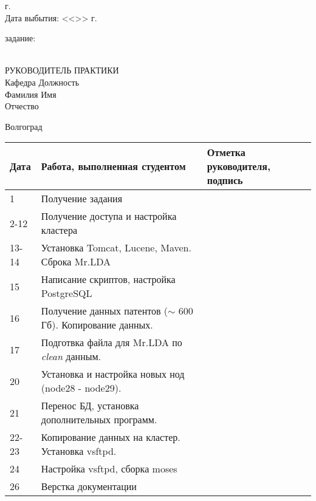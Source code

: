 \begin{titlepage}
\begin{flushleft}
        \the\year г.\\
        Дата выбытия: \hspace{3cm}<<\underline{\hspace{1cm}}>> \underline{\hspace{3cm}} 
        \the\year г.
    \end{flushleft}
    \vspace{0.5cm}
     задание: \underline{\hspace{11.25cm}}\\
    \underline{\hspace{\textwidth}}\\
    \vspace{0.5cm}
    \begin{flushleft}
        РУКОВОДИТЕЛЬ ПРАКТИКИ\\
        Кафедра \underline{\hspace{5.15cm}} Должность \underline{\hspace{5cm}} \\
        Фамилия \underline{\hspace{5cm}} Имя \underline{\hspace{6.5cm}}\\
        Отчество \underline{\hspace{5cm}}
    \end{flushleft}
    \vspace{\fill}
    \begin{center}
        Волгоград \the\year
    \end{center}
\end{titlepage}
\begin{table}[h!]
    \centering
    \begin{tabular}{|m{}|m{}|m{}|}
        \hline
        Дата & Работа, выполненная студентом & Отметка
        руководителя, подпись \\ \hline
        1 & Получение задания & \\ \hline
        2-12 & Получение доступа и настройка кластера & \\ \hline
        13-14 & Установка Tomcat, Lucene, Maven. Сброка Mr.LDA & \\ \hline
        15 & Написание скриптов, настройка PostgreSQL & \\ \hline
        16 & Получение данных патентов (\( \sim \) 600 Гб). Копирование данных. & \\ \hline
        17 & Подготвка файла для Mr.LDA по \emph{clean} данным. & \\ \hline
        20 & Установка и настройка новых нод (node28 - node29). & \\ \hline
        21 & Перенос БД, установка дополнительных программ. & \\ \hline
        22-23 & Копирование данных на кластер. Установка vsftpd. & \\ \hline
        24 & Настройка vsftpd, сборка moses & \\ \hline
        26 & Верстка документации & \\ \hline
    \end{tabular}
\end{table}
